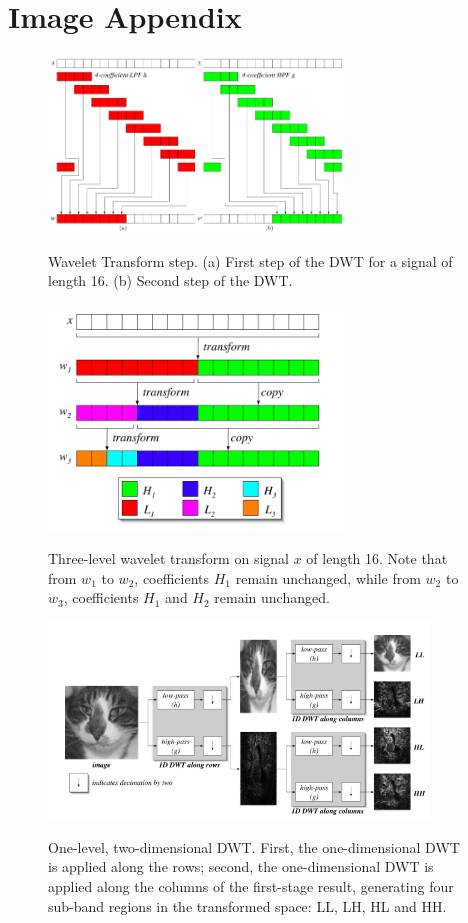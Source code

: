 \documentclass{article}
\begin{document}
	\section{Image Appendix}
	\FloatBarrier
	\begin{figure}[h]
		\caption{Wavelet Transform step. (a) First step of the DWT for a signal of length 16. (b) Second step of the DWT.}
		\centering
		\includegraphics[width=0.7\textwidth]{imgs/waveletstep}
		\label{fig:waveletstep}
	\end{figure}
	\FloatBarrier
	\begin{figure}[h]
		\caption{Three-level wavelet transform on signal $x$ of length 16. Note that from $w_1$ to $w_2$, coefficients $H_1$ remain unchanged, while from $w_2$ to $w_3$, coefficients $H_1$ and $H_2$ remain unchanged.}
		\centering
		\includegraphics[width=0.7\textwidth]{imgs/three-level-DWT}
		\label{fig:3-level-DWT}
	\end{figure}
	\FloatBarrier
	\begin{figure}[h]
		\caption{One-level, two-dimensional DWT. First, the one-dimensional DWT is applied along the rows; second, the one-dimensional DWT is applied along the columns of the first-stage result, generating four sub-band regions in the transformed space: LL, LH, HL and HH.}
		\centering
		\includegraphics[width=0.9\textwidth]{imgs/2-di-wavelet}
		\label{fig:2-di-DWT}
	\end{figure}
\end{document}
